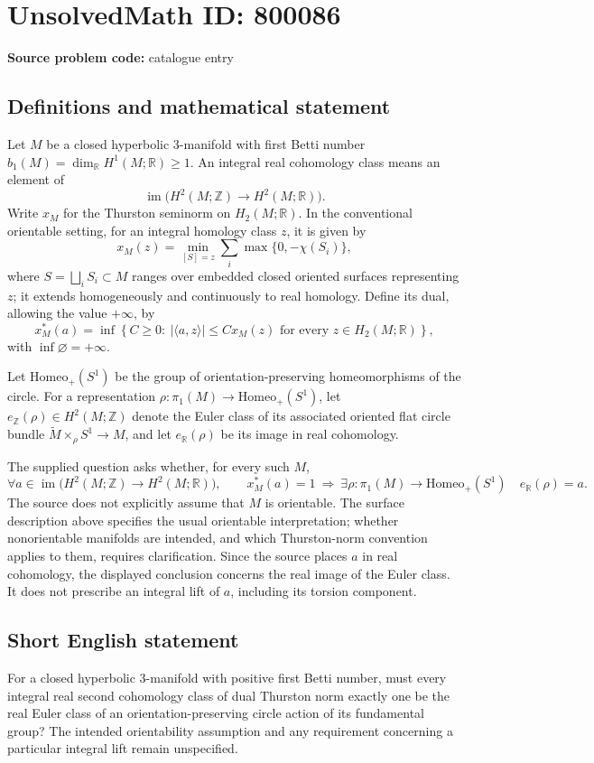 \documentclass[11pt]{article}
\newcommand{\Z}{\mathbb{Z}}
\newcommand{\R}{\mathbb{R}}
\begin{document}
\section*{UnsolvedMath ID: 800086}
\textbf{Source problem code:} catalogue entry
\subsection{Definitions and mathematical statement}
Let \(M\) be a closed hyperbolic \(3\)-manifold with first Betti number \(b_1(M)=\dim_{\R}H^1(M;\R)\geq 1\). An integral real cohomology class means an element of
\[
\operatorname{im}\bigl(H^2(M;\Z)\longrightarrow H^2(M;\R)\bigr).
\]
Write \(x_M\) for the Thurston seminorm on \(H_2(M;\R)\). In the conventional orientable setting, for an integral homology class \(z\), it is given by
\[
x_M(z)=\min_{[S]=z}\sum_i\max\{0,-\chi(S_i)\},
\]
where \(S=\bigsqcup_i S_i\subset M\) ranges over embedded closed oriented surfaces representing \(z\); it extends homogeneously and continuously to real homology. Define its dual, allowing the value \(+\infty\), by
\[
x_M^*(a)=\inf\left\{C\geq 0:\ |\langle a,z\rangle|\leq Cx_M(z)\text{ for every }z\in H_2(M;\R)\right\},
\]
with \(\inf\varnothing=+\infty\).

Let \(\mathrm{Homeo}_+(S^1)\) be the group of orientation-preserving homeomorphisms of the circle. For a representation \(\rho:\pi_1(M)\to\mathrm{Homeo}_+(S^1)\), let \(e_{\Z}(\rho)\in H^2(M;\Z)\) denote the Euler class of its associated oriented flat circle bundle \(\widetilde M\times_{\rho}S^1\to M\), and let \(e_{\R}(\rho)\) be its image in real cohomology.

The supplied question asks whether, for every such \(M\),
\[
\forall a\in\operatorname{im}\bigl(H^2(M;\Z)\to H^2(M;\R)\bigr),\qquad
x_M^*(a)=1\ \Longrightarrow\ \exists\rho:\pi_1(M)\to\mathrm{Homeo}_+(S^1)
\quad e_{\R}(\rho)=a.
\]
The source does not explicitly assume that \(M\) is orientable. The surface description above specifies the usual orientable interpretation; whether nonorientable manifolds are intended, and which Thurston-norm convention applies to them, requires clarification. Since the source places \(a\) in real cohomology, the displayed conclusion concerns the real image of the Euler class. It does not prescribe an integral lift of \(a\), including its torsion component.
\subsection{Short English statement}
For a closed hyperbolic \(3\)-manifold with positive first Betti number, must every integral real second cohomology class of dual Thurston norm exactly one be the real Euler class of an orientation-preserving circle action of its fundamental group? The intended orientability assumption and any requirement concerning a particular integral lift remain unspecified.
\end{document}
